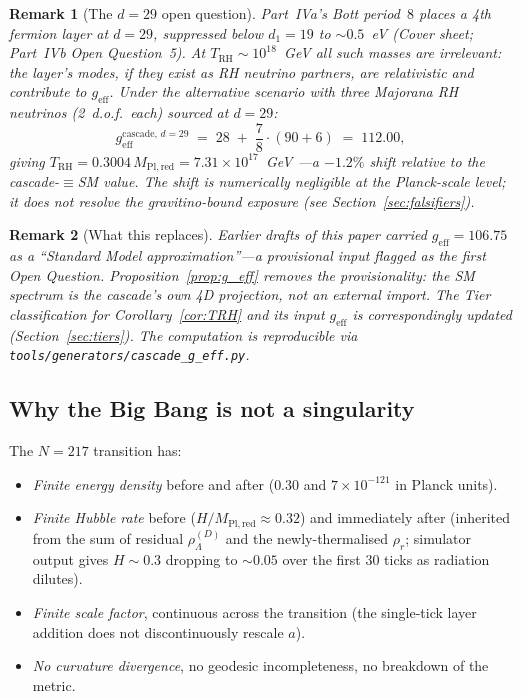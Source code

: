\documentclass[12pt,a4paper]{article}
\newtheorem*{remark}{Remark}
\begin{document}
\begin{remark}[The $d = 29$ open question]\label{rem:d29}
Part~IVa's Bott period~$8$ places a 4th fermion layer at $d = 29$,
suppressed below $d_1 = 19$ to $\sim\! 0.5$~eV (Cover sheet; Part~IVb
Open Question~5). At $T_{\mathrm{RH}} \sim 10^{18}$~GeV all such masses
are irrelevant: the layer's modes, if they exist as RH neutrino
partners, are relativistic and contribute to $g_{\mathrm{eff}}$. Under
the alternative scenario with three Majorana RH neutrinos (2~d.o.f.\
each) sourced at $d = 29$:
\[
g_{\mathrm{eff}}^{\mathrm{cascade},\,d{=}29}
\;=\; 28 \;+\; \frac{7}{8}\cdot(90 + 6) \;=\; 112.00,
\]
giving $T_{\mathrm{RH}} = 0.3004\,M_{\mathrm{Pl,red}} = 7.31 \times 10^{17}$~GeV
---a $-1.2\%$ shift relative to the cascade-${\equiv}$SM value. The shift
is numerically negligible at the Planck-scale level; it does not resolve
the gravitino-bound exposure (see Section~\ref{sec:falsifiers}).
\end{remark}

\begin{remark}[What this replaces]\label{rem:replaces-SM}
Earlier drafts of this paper carried $g_{\mathrm{eff}} = 106.75$ as a
``Standard Model approximation''---a provisional input flagged as the
first Open Question. Proposition~\ref{prop:g_eff} removes the
provisionality: the SM spectrum is the cascade's own 4D projection, not
an external import. The Tier classification for
Corollary~\ref{cor:TRH} and its input $g_{\mathrm{eff}}$ is correspondingly
updated (Section~\ref{sec:tiers}). The computation is reproducible via
\texttt{tools/generators/cascade\_g\_eff.py}.
\end{remark}

\subsection{Why the Big Bang is not a singularity}

The $N = 217$ transition has:
\begin{itemize}[nosep]
\item \emph{Finite energy density} before and after ($0.30$ and $7 \times 10^{-121}$ in Planck units).
\item \emph{Finite Hubble rate} before ($H / M_{\mathrm{Pl,red}} \approx 0.32$)
and immediately after (inherited from the sum of residual $\rho_\Lambda^{(D)}$
and the newly-thermalised $\rho_r$; simulator output gives $H \sim 0.3$ dropping
to $\sim 0.05$ over the first 30 ticks as radiation dilutes).
\item \emph{Finite scale factor}, continuous across the transition (the
single-tick layer addition does not discontinuously rescale $a$).
\item \emph{No curvature divergence}, no geodesic incompleteness, no breakdown
of the metric.
\end{itemize}
\end{document}
